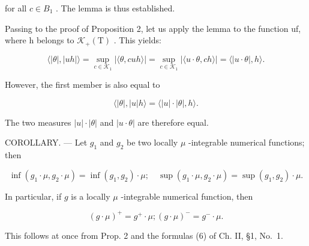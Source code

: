 for all \(c \in B_{1}\) . The lemma is thus established.

Passing to the proof of Proposition 2, let us apply the lemma to the function uf, where h belongs to \(\mathcal{K}_{+}(\mathrm{T})\) . This yields:

\[
\langle | \theta |, | u h | \rangle = \sup _ {c \in \mathscr {K} _ {1}} | \langle \theta , c u h \rangle | = \sup _ {c \in \mathscr {K} _ {1}} | \langle u \cdot \theta , c h \rangle | = \langle | u \cdot \theta |, h \rangle .
\]

However, the first member is also equal to

\[
\langle | \theta |, | u | h \rangle = \langle | u | \cdot | \theta |, h \rangle .
\]

The two measures \(|u| \cdot |\theta|\) and \(|u \cdot \theta|\) are therefore equal.

COROLLARY. --- Let \(g_{1}\) and \(g_{2}\) be two locally \(\mu\) -integrable numerical functions; then

\[
\inf (g _ {1} \cdot \mu , g _ {2} \cdot \mu) = \inf (g _ {1}, g _ {2}) \cdot \mu ; \quad \sup (g _ {1} \cdot \mu , g _ {2} \cdot \mu) = \sup (g _ {1}, g _ {2}) \cdot \mu .
\]

In particular, if \(g\) is a locally \(\mu\) -integrable numerical function, then

\[
(g \cdot \mu) ^ {+} = g ^ {+} \cdot \mu ; (g \cdot \mu) ^ {-} = g ^ {-} \cdot \mu .
\]

This follows at once from Prop. 2 and the formulas (6) of Ch. II, §1, No.~1.

